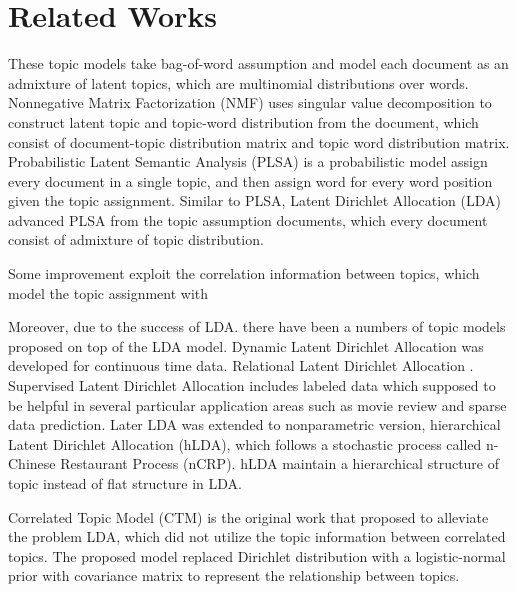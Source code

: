 \section{Related Works}\label{AB}
These topic models take bag-of-word assumption and model each document as an admixture of latent topics, which are multinomial distributions over words.
Nonnegative Matrix Factorization (NMF) uses singular value decomposition to construct latent topic and topic-word distribution from the document, which consist of document-topic distribution matrix and topic word distribution matrix.
Probabilistic Latent Semantic Analysis (PLSA) is a probabilistic model assign every document in a single topic, and then assign word for every word position given the topic assignment.
Similar to PLSA, Latent Dirichlet Allocation (LDA) \cite{blei_latent_2003} advanced PLSA from the topic assumption documents, which every document consist of admixture of topic distribution.

Some improvement exploit the correlation information between topics, which model the topic assignment with 

Moreover, due to the  success of LDA. there have been a numbers of topic models proposed on top of the LDA model. Dynamic Latent Dirichlet Allocation\cite{blei_probabilistic_2012} was developed for continuous time data. Relational Latent Dirichlet Allocation \cite{chang_relational_nodate} . Supervised Latent Dirichlet Allocation \cite{mcauliffe_supervised_2008} includes labeled data which supposed to be helpful in several particular application areas such as movie review and sparse data prediction. Later LDA was extended to nonparametric version, hierarchical Latent Dirichlet Allocation (hLDA)\cite{teh_hierarchical_2006}, which follows a stochastic process called n-Chinese Restaurant Process (nCRP)\cite{teh_tutorial_nodate}. hLDA maintain a hierarchical structure of topic instead of flat structure in LDA. %

Correlated Topic Model (CTM)\cite{blei_correlated_2007} is the original work that proposed to alleviate the problem LDA, which did not utilize the topic information between correlated topics. The proposed model replaced Dirichlet distribution with a logistic-normal prior with covariance matrix to represent the relationship between topics.
% 

